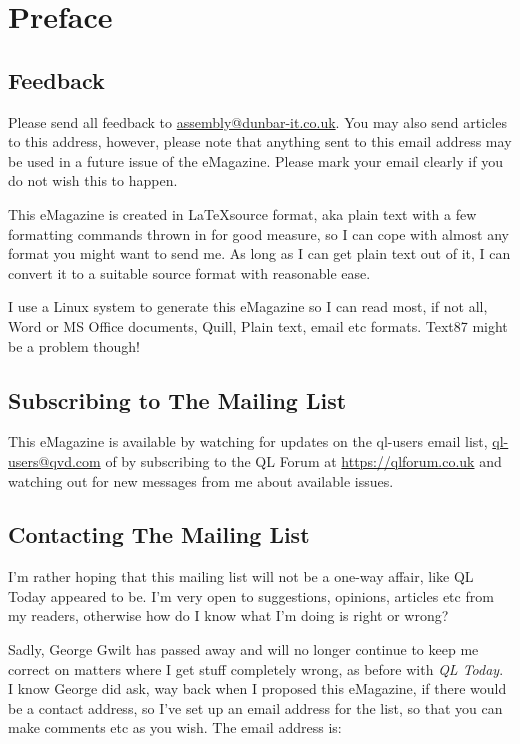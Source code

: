 \chapter{Preface}
\section{Feedback}\label{section: feedback}
Please send all feedback to \url{assembly@dunbar-it.co.uk}. You may also send articles to
this address, however, please note that anything sent to this email address may be used in a future issue of the eMagazine. Please mark your email clearly if you do not wish this to happen.

This eMagazine is created in \LaTeX  source format, aka plain text with a few formatting commands thrown in for good measure, so I can cope with almost any format you might want to send me. As long as I can get plain text out of it, I can convert it to a suitable source format with reasonable ease. 

I use a Linux system to generate this eMagazine so I can read most, if not all, Word or MS Office documents, Quill, Plain text, email etc formats. Text87 might be a problem though!

\section{Subscribing to The Mailing List}
This eMagazine is available by watching for updates on the ql-users email list, \url{ql-users@qvd.com} of by subscribing to the QL Forum at \url{https://qlforum.co.uk} and watching out for new messages from me about available issues.

\section{Contacting The Mailing List}
I'm rather hoping that this mailing list will not be a one-way affair, like QL Today appeared to be. I'm very open to suggestions, opinions, articles etc from my readers, otherwise how do I know what I'm doing is right or wrong?

Sadly, George Gwilt has passed away and will no longer continue to keep me correct on matters where I get stuff completely wrong, as before with \emph{QL Today}. I know George did ask, way back when I proposed this eMagazine, if there would be a contact address, so I've set up an email address for the list, so that you can make comments etc as you wish. The email address is:

